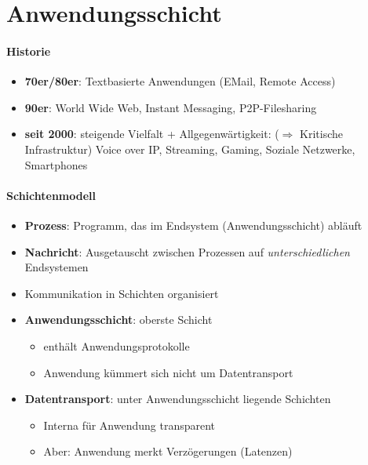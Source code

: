 \section{Anwendungsschicht}

\paragraph{Historie}
\begin{itemize}
  \item \textbf{70er/80er}: Textbasierte Anwendungen (EMail, Remote Access)
  \item \textbf{90er}: World Wide Web, Instant Messaging, P2P-Filesharing
  \item \textbf{seit 2000}: steigende Vielfalt + Allgegenwärtigkeit: (\( \Rightarrow \) Kritische Infrastruktur) Voice over IP, Streaming, Gaming, Soziale Netzwerke, Smartphones
\end{itemize}

\paragraph{Schichtenmodell}
\begin{itemize}
  \item \textbf{Prozess}: Programm, das im Endsystem (Anwendungsschicht) abläuft
  \item \textbf{Nachricht}: Ausgetauscht zwischen Prozessen auf \emph{unterschiedlichen} Endsystemen
  \item Kommunikation in Schichten organisiert
  \item \textbf{Anwendungsschicht}: oberste Schicht
  \begin{itemize}
    \item enthält Anwendungsprotokolle
    \item Anwendung kümmert sich nicht um Datentransport
  \end{itemize}
  \item \textbf{Datentransport}: unter Anwendungsschicht liegende Schichten
  \begin{itemize}
    \item Interna für Anwendung transparent
    \item Aber: Anwendung merkt Verzögerungen (Latenzen)
  \end{itemize}
\end{itemize}

